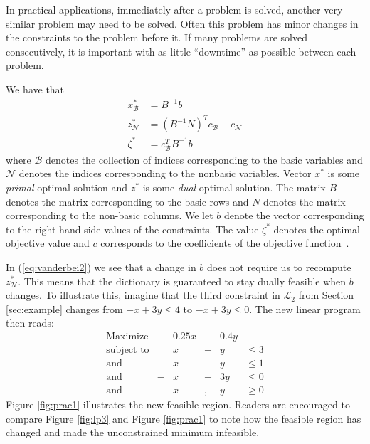 In practical applications, immediately after a problem is solved, another very
similar problem may need to be solved.
Often this problem has minor changes in the constraints to the problem before
it.
If many problems are solved consecutively, it is important with as little
``downtime'' as possible between each problem.

We have that
\begin{align}
    x_{\mathcal{B}}^* &= B^{-1}b \label{eq:vanderbei1} \\
    z_{\mathcal{N}}^* &= (B^{-1}N)^Tc_{\mathcal{B}}-c_{\mathcal{N}}
                                                      \label{eq:vanderbei2} \\
    \zeta^* &= c_{\mathcal{B}}^TB^{-1}b \label{eq:vanderbei3}
\end{align}
where $\mathcal{B}$ denotes the collection of indices corresponding to the
basic variables and $\mathcal{N}$ denotes the indices corresponding to the
nonbasic variables.
Vector $x^*$ is some \emph{primal} optimal solution and $z^*$ is some
\emph{dual} optimal solution.
The matrix $B$ denotes the matrix corresponding to the basic rows and $N$
denotes the matrix corresponding to the non-basic columns.
We let $b$ denote the vector corresponding to the right hand side values of the
constraints.
The value $\zeta^*$ denotes the optimal objective value and $c$ corresponds to
the coefficients of the objective function~\cite{vanderbei}.

In (\ref{eq:vanderbei2}) we see that a change in $b$ does not require us to
recompute $z_{\mathcal{N}}^*$.
This means that the dictionary is guaranteed to stay dually feasible when $b$
changes.
To illustrate this, imagine that the third constraint in $\mathcal{L}_2$ from
Section \ref{sec:example} changes from $-x + 3y \leq 4$ to
$-x + 3y \leq 0$. The new linear program then reads:
\[
\begin{array}{lcrcrl}
    \textrm{Maximize}   & & 0.25 x &+& 0.4 y & \\
    \textrm{subject to} & &      x &+&     y & \leq 3 \\
    \textrm{and}        & &      x &-&     y & \leq 1 \\
    \textrm{and}        &-&      x &+&   3 y & \leq 0 \\
    \textrm{and}        & &      x &,&     y & \geq 0
\end{array}
\]
Figure \ref{fig:prac1} illustrates the new feasible region.
Readers are encouraged to compare Figure \ref{fig:lp3} and Figure
\ref{fig:prac1} to note how the feasible region has changed and made the
unconstrained minimum infeasible.

